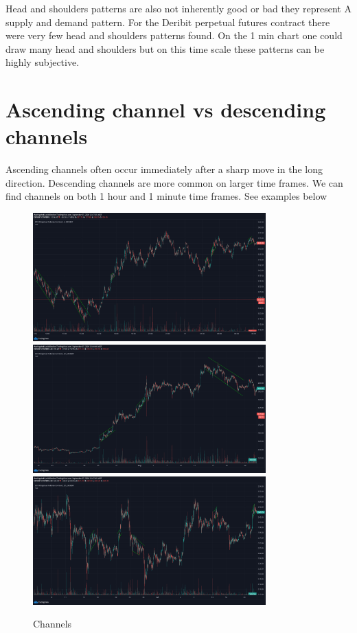 Head and shoulders patterns are also not inherently good or bad they represent A supply and demand pattern. For the Deribit perpetual futures contract there were very few head and shoulders patterns found. On the 1 min chart one could draw many head and shoulders but on this time scale these patterns can be highly subjective.
\section{ Ascending channel vs descending channels}
Ascending channels often occur immediately after a sharp move in the long direction. Descending channels are more common on larger time frames.  We can find channels on both 1 hour and 1 minute time frames. 
See examples below

\begin{figure}[H]
\center
\includegraphics[width=0.8\textwidth]{fig/chan/c1.png}
\includegraphics[width=0.8\textwidth]{fig/chan/c2.png}
\includegraphics[width=0.8\textwidth]{fig/chan/c3.png}
\caption{Channels}
\end{figure}



